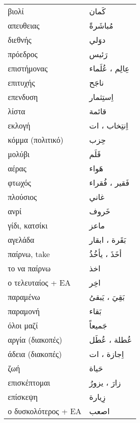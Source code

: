 \documentclass[twocolumn,a4paper]{article}
\newcommand{\ar}[1]{\textarabic{#1}}
\newcommand{\pl}{\raisebox{0.15ex}{\footnotesize ◍}}
\newcommand{\normpl}[1]{\ar{ #1، ات }}
\newcommand{\vrf}{\raisebox{0.15ex}{\footnotesize ◉}}
\newcommand{\mas}{\raisebox{0.15ex}{\footnotesize ◫}}
\begin{document}
\begin{mpsupertabular}{ P{0.5\textwidth} P{0.5\textwidth} }
βιολί                        & \ar{ كَمان } \\
απευθειας                    & \ar{ مُباشَرةً } \\
διεθνής                      & \ar{ دوَلي } \\
πρόεδρος                     & \ar{ رَئيس } \\
επιστήμονας \pl              & \ar{ عِالِم ، عُلَماء } \\
επιτυχής                     & \ar{ ناجَح } \\
επενδυση \mas                & \ar{ اِستِثمار } \\
λίστα                        & \ar{ قائمة } \\
εκλογή \pl                   & \normpl{ اِنتِخاب } \\
κόμμα (πολιτικό)             & \ar{ حِزب } \\
μολύβι                       & \ar{ قَلَم } \\
αέρας                        & \ar{ هَواء } \\
φτωχός \pl                   & \ar{ فَقير ، فُقراء  } \\
πλούσιος                     & \ar{ غاني } \\
ανρί                         & \ar{ خَروف } \\
γίδι, κατσίκι                & \ar{ ماعز } \\
αγελάδα \pl                  & \ar{ بَقَرة ، ابقار } \\
παίρνω, take \vrf            & \ar{ أخَذَ ، يأخُذُ } \\
το να παίρνω \mas            & \ar{ اخذ } \\
ο τελευταίος + ΕΑ            & \ar{ اخِر } \\
παραμένω \vrf                & \ar{ بَقِيَ ، يَبقىُ } \\
παραμονή \mas                & \ar{ بَقاء } \\
όλοι μαζί                    & \ar{ جَميعاً } \\
αργία (διακοπές) \pl         & \ar{ عُطلة ، عُطَل } \\
άδεια (διακοπές) \pl         & \normpl{ اِجازة } \\
ζωή                          & \ar{ حَياة } \\
επισκέπτομαι \vrf            & \ar{ زارَ ، يزورُ } \\
επίσκεψη \mas                & \ar{ زِيارة } \\
ο δυσκολότερος + ΕΑ          & \ar{ اصعب } \\

\end{mpsupertabular}
\end{document}
